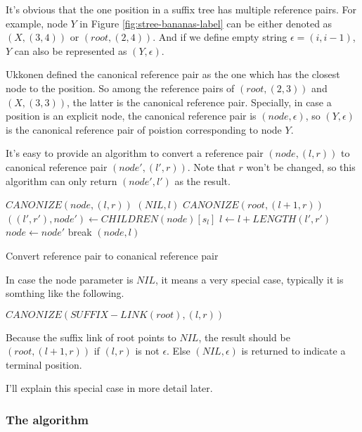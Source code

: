 \documentclass{article}
\begin{document}
It's obvious that the one position in a suffix tree has multiple reference pairs.
For example, node $Y$ in Figure \ref{fig:stree-bananas-label} can be either
denoted as $(X, (3, 4))$ or $(root, (2, 4))$. And if we define empty string 
$\epsilon=(i, i-1)$, $Y$ can also be represented as $(Y, \epsilon)$.

Ukkonen defined the canonical reference pair as the one which has the closest node
to the position. So among the reference pairs of $(root, (2, 3))$ and $(X, (3, 3))$,
the latter is the canonical reference pair. Specially, in case a position is an
explicit node, the canonical reference pair is $(node, \epsilon)$, so $(Y, \epsilon)$
is the canonical reference pair of poistion corresponding to node $Y$.

It's easy to provide an algorithm to convert a reference pair $(node, (l, r))$ 
to canonical reference pair $(node', (l', r))$. Note that $r$ won't be changed,
so this algorithm can only return $(node', l')$ as the result.

\begin{algorithm}
\begin{algorithmic}
\STATE $CANONIZE(node, (l, r))$
      \RETURN $(NIL, l)$
    \ELSE
      \RETURN $CANONIZE(root, (l+1, r))$
    \ENDIF
  \ENDIF
    \STATE $((l', r'), node') \leftarrow CHILDREN(node)[s_l]$
      \STATE $l \leftarrow l+LENGTH(l', r')$
      \STATE $node \leftarrow node'$
    \ELSE
      \STATE break
    \ENDIF
  \ENDWHILE
  \RETURN $(node, l)$
\end{algorithmic}
\caption{Convert reference pair to conanical reference pair}
\label{algo:strie1}
\end{algorithm}

In case the node parameter is $NIL$, it means a very special case, typically it is somthing
like the following.

$CANONIZE(SUFFIX-LINK(root), (l, r))$

Because the suffix link of root points to $NIL$, the result should be $(root, (l+1, r))$
if $(l, r)$ is not $\epsilon$. Else $(NIL, \epsilon)$ is returned to indicate
a terminal position.

I'll explain this special case in more detail later.

\subsubsection{The algorithm}
\end{document}
